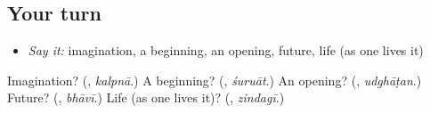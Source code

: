 \subsection*{Your turn}
\begin{itemize}
\raggedright
  \item \emph{Say it:} imagination, a beginning, an opening, future, life (as one lives it)
\end{itemize}

\begin{tcolorbox}[breakable,colback=teal!4,colframe=teal!35!black,title={Before you move on}]
Imagination? (\textbf{}, \emph{kalpnā}.) A beginning? (\textbf{}, \emph{śuruāt}.) An opening? (\textbf{}, \emph{udghāṭan}.) Future? (\textbf{}, \emph{bhāvī}.) Life (as one lives it)? (\textbf{}, \emph{zindagī}.)
\end{tcolorbox}
